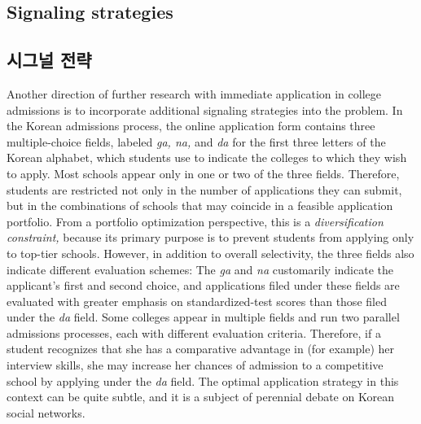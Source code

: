 \documentclass[11pt]{article} %
\theoremstyle{definition}
\theoremstyle{definition}
\begin{document}
\ifen \subsection{Signaling strategies}\else \subsection{시그널 전략}\fi
\ifen
Another direction of further research with immediate application in college admissions is to incorporate additional signaling strategies into the problem. In the Korean admissions process, the online application form contains three multiple-choice fields, labeled \emph{ga, na,} and \emph{da} for the first three letters of the Korean alphabet, which students use to indicate the colleges to which they wish to apply. Most schools appear only in one or two of the three fields. Therefore, students are restricted not only in the number of applications they can submit, but in the combinations of schools that may coincide in a feasible application portfolio. From a portfolio optimization perspective, this is a \emph{diversification constraint,} because its primary purpose is to prevent students from applying only to top-tier schools. However, in addition to overall selectivity, the three fields also indicate different evaluation schemes: The \emph{ga} and \emph{na} customarily indicate the applicant's first and second choice, and applications filed under these fields are evaluated with greater emphasis on standardized-test scores than those filed under the \emph{da} field. Some colleges appear in multiple fields and run two parallel admissions processes, each with different evaluation criteria. Therefore, if a student recognizes that she has a comparative advantage in (for example) her interview skills, she may increase her chances of admission to a competitive school by applying under the \emph{da} field. The optimal application strategy in this context can be quite subtle, and it is a subject of perennial debate on Korean social networks.
\end{document}
